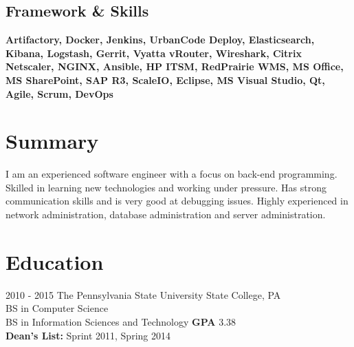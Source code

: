 \documentclass[]{friggeri-cv}
\begin{document}
\begin{aside}
  \section{Framework & Skills}
    \textbf{Artifactory, Docker, Jenkins, UrbanCode Deploy, Elasticsearch, Kibana, Logstash,
    Gerrit, Vyatta vRouter, Wireshark, Citrix Netscaler, NGINX, Ansible, HP ITSM, RedPrairie WMS,
    MS Office, MS SharePoint, SAP R3, ScaleIO, Eclipse, MS Visual Studio, Qt, Agile, Scrum, DevOps}
\end{aside}

\section{Summary}
  {I am an experienced software engineer with a focus on back-end programming. Skilled in learning new
  technologies and working under pressure. Has strong communication skills and is very good at
  debugging issues. Highly experienced in network administration, database administration and server
  administration.\\}

\section{Education}
\begin{entrylist}
  \entry
    {2010 - 2015}
    {The Pennsylvania State University \hfill \hfill State College, PA}
    {\\BS in Computer Science \\BS in Information Sciences and Technology}
    {\textbf{GPA} 3.38\\
    \textbf{Dean's List:} Sprint 2011, Spring 2014\\}

\end{entrylist}
\end{document}
